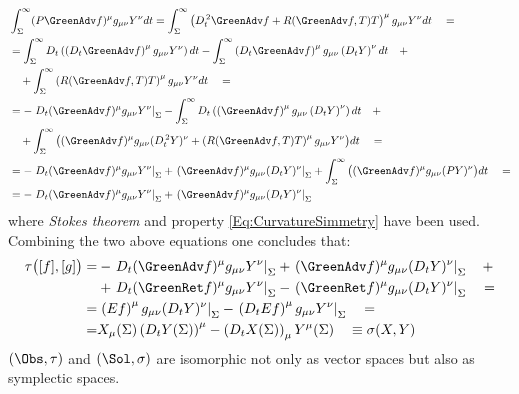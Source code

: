 \documentclass[Main]{subfiles}
\begin{document}
		\begin{align}
			&\int_\Sigma^\infty (P \GreenAdv f)^\mu g_{\mu \nu} Y^\nu dt = \int_\Sigma^\infty \left( D_t^{\,2} \GreenAdv f +R(\GreenAdv f,T)T \right)^\mu g_{\mu \nu} Y^\nu dt \quad = \nonumber \\
			&= 
			 \int_\Sigma^\infty D_t \left( \left(D_t  \GreenAdv f \right)^\mu g_{\mu \nu} Y^\nu \right)dt -
			 \int_\Sigma^\infty \left( D_t  \GreenAdv f \right)^\mu g_{\mu \nu} \left( D_t Y \right)^\nu dt \quad + \nonumber \\
			 &\quad + \int_\Sigma^\infty \left( R( \GreenAdv f,T)T \right)^\mu g_{\mu \nu} Y^\nu dt \quad = \nonumber \\
			&= 
			 - \left. D_t( \GreenAdv f)^\mu g_{\mu \nu} Y^\nu \right\vert_\Sigma -
			 \int_\Sigma^\infty D_t \left( \left( \GreenAdv f \right)^\mu g_{\mu \nu} \left( D_t Y \right)^\nu \right)dt \quad + \nonumber \\
			 &\quad + \int_\Sigma^\infty \big(
			 (\GreenAdv f)^\mu g_{\mu \nu} (D_t^{\, 2}Y)^\nu + 
			 \left(R( \GreenAdv f,T)T \right)^\mu g_{\mu \nu} Y^\nu
			 \big) dt	\quad =	 \nonumber \\
			 &=
			 -   \left. D_t( \GreenAdv f)^\mu g_{\mu \nu} Y^\nu \right\vert_\Sigma
			 +  \left. ( \GreenAdv f)^\mu g_{\mu \nu} (D_t Y)^\nu \right\vert_\Sigma
			 + \int_\Sigma^\infty \big(
			 (\GreenAdv f)^\mu g_{\mu \nu} (P Y)^\nu 
			 \big) dt \quad =\nonumber \\
			 &= 
			 -   \left. D_t( \GreenAdv f)^\mu g_{\mu \nu} Y^\nu \right\vert_\Sigma
			 +  \left. ( \GreenAdv f)^\mu g_{\mu \nu} (D_t Y)^\nu \right\vert_\Sigma
		\end{align}
		where \emph{Stokes theorem} and property \ref{Eq:CurvatureSimmetry} have been used.
		\\
		Combining the two above equations one concludes that:
		\begin{align}
		\tau\big( [f], [g] \big) =& 
			 -   \left. D_t( \GreenAdv f)^\mu g_{\mu \nu} Y^\nu \right\vert_\Sigma
			 +  \left. ( \GreenAdv f)^\mu g_{\mu \nu} (D_t Y)^\nu \right\vert_\Sigma \quad +
		\nonumber \\
			&+ \left. D_t( \GreenRet f)^\mu g_{\mu \nu} Y^\nu \right\vert_\Sigma
			   -  \left. ( \GreenRet f)^\mu g_{\mu \nu} (D_t Y)^\nu \right\vert_\Sigma		
		 \quad =  \nonumber\\
		=&\left. \left( E f \right)^\mu g_{\mu \nu} ( D_t Y)^\nu\right\vert_\Sigma	 
		-  \left.\left(D_t E f \right)^\mu g_{\mu \nu}  Y^\nu \right\vert_\Sigma	\quad = \nonumber \\
		=& X_\mu(\Sigma) \left( D_t Y (\Sigma)\right)^\mu - \left(D_t X(\Sigma)\right)_\mu Y^\mu(\Sigma) \quad \equiv \sigma( X, Y)
		\end{align}
		$(\Obs, \tau)$ and $(\Sol, \sigma)$ are isomorphic not only as vector spaces but also as symplectic spaces.
\end{document}
